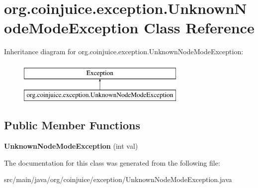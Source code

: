 \hypertarget{classorg_1_1coinjuice_1_1exception_1_1_unknown_node_mode_exception}{\section{org.\-coinjuice.\-exception.\-Unknown\-Node\-Mode\-Exception Class Reference}
\label{classorg_1_1coinjuice_1_1exception_1_1_unknown_node_mode_exception}
}
Inheritance diagram for org.\-coinjuice.\-exception.\-Unknown\-Node\-Mode\-Exception\-:\begin{figure}[H]
\begin{center}
\leavevmode
\includegraphics[height=2.000000cm]{classorg_1_1coinjuice_1_1exception_1_1_unknown_node_mode_exception}
\end{center}
\end{figure}
\subsection*{Public Member Functions}
\begin{DoxyCompactItemize}
\item 
\hypertarget{classorg_1_1coinjuice_1_1exception_1_1_unknown_node_mode_exception_a63acc0a110791387cd40e34d91bb559e}{{\bfseries Unknown\-Node\-Mode\-Exception} (int val)}\label{classorg_1_1coinjuice_1_1exception_1_1_unknown_node_mode_exception_a63acc0a110791387cd40e34d91bb559e}

\end{DoxyCompactItemize}


The documentation for this class was generated from the following file\-:\begin{DoxyCompactItemize}
\item 
src/main/java/org/coinjuice/exception/Unknown\-Node\-Mode\-Exception.\-java\end{DoxyCompactItemize}

